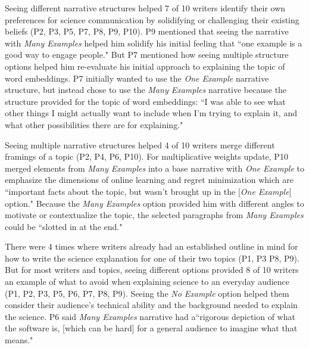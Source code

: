 

Seeing different narrative structures helped 7 of 10 writers identify their own preferences for science communication by solidifying or challenging their existing beliefs (P2, P3, P5, P7, P8, P9, P10). P9 mentioned that seeing the narrative with \textit{Many Examples} helped him solidify his initial feeling that ``one example is a good way to engage people." But P7 mentioned how seeing multiple structure options helped him re-evaluate his initial approach to explaining the topic of word embeddings. P7 initially wanted to use the \textit{One Example} narrative structure, but instead chose to use the \textit{Many Examples} narrative because the structure provided for the topic of word embeddings: ``I was able to see what other things I might actually want to include when I'm trying to explain it, and what other possibilities there are for explaining." 

Seeing multiple narrative structures helped 4 of 10 writers merge different framings of a topic (P2, P4, P6, P10). For multiplicative weights update, P10 merged elements from \textit{Many Examples} into a base narrative with \textit{One Example} to emphasize the dimensions of online learning and regret minimization which are ``important facts about the topic, but wasn't brought up in the [\textit{One Example}] option." Because the \textit{Many Examples} option provided him with different angles to motivate or contextualize the topic, the selected paragraphs from \textit{Many Examples} could be ``slotted in at the end."  

There were 4 times where writers already had an established outline in mind for how to write the science explanation for one of their two topics (P1, P3 P8, P9). But for most writers and topics, seeing different options provided 8 of 10 writers an example of what to avoid when explaining science to an everyday audience (P1, P2, P3, P5, P6, P7, P8, P9). Seeing the \textit{No Example} option helped them consider their audience's technical ability and the background needed to explain the science. P6 said \textit{Many Examples} narrative had a``rigorous depiction of what the software is, [which can be hard] for a general audience to imagine what that means." 

